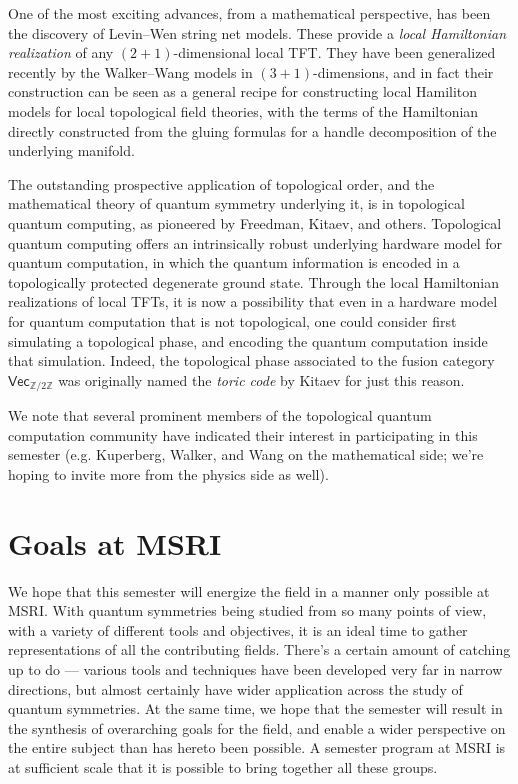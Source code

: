 \documentclass[12pt]{article}
\begin{document}
One of the most exciting advances, from a mathematical perspective, has been the discovery of Levin--Wen string net models. These provide a \emph{local Hamiltonian realization} of any $(2+1)$-dimensional local TFT. They have been generalized recently by the Walker--Wang models in $(3+1)$-dimensions, and in fact their construction can be seen as a general recipe for constructing local Hamiliton models for local topological field theories, with the terms of the Hamiltonian directly constructed from the gluing formulas for a handle decomposition of the underlying manifold.

The outstanding prospective application of topological order, and the mathematical theory of quantum symmetry underlying it, is in topological quantum computing, as pioneered by Freedman, Kitaev, and others. Topological quantum computing offers an intrinsically robust underlying hardware model for quantum computation, in which the quantum information is encoded in a topologically protected degenerate ground state. Through the local Hamiltonian realizations of local TFTs, it is now a possibility that even in a hardware model for quantum computation that is not topological, one could consider first simulating a topological phase, and encoding the quantum computation inside that simulation. Indeed, the topological phase associated to the fusion category $\textsf{Vec}_{\mathbb Z / 2 \mathbb Z}$ was originally named the \emph{toric code} by Kitaev for just this reason.

We note that several prominent members of the topological quantum computation community   have indicated their interest in participating in this semester (e.g.  Kuperberg, Walker, and Wang on the mathematical side; we're hoping to invite more from the physics side as well).

\section{Goals at MSRI}
We hope that this semester will energize the field in a manner only possible at MSRI. With quantum symmetries being studied from so many points of view, with a variety of different tools and objectives, it is an ideal time to gather representations of all the contributing fields. There's a certain amount of catching up to do --- various tools and techniques have been developed very far in narrow directions, but almost certainly have wider application across the study of quantum symmetries.  At the same time, we hope that the semester will result in the synthesis of overarching goals for the field, and enable a wider perspective on the entire subject than has hereto been possible. A semester program at MSRI is at sufficient scale that it is possible to bring together all these groups.
\end{document}
